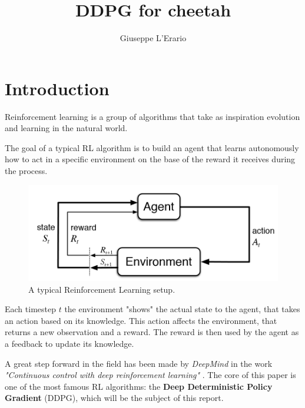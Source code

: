 \documentclass[10pt,a4paper]{scrartcl}
\author{Giuseppe L'Erario}
\date{}
\title{DDPG for cheetah}
\begin{document}


\tableofcontents

\clearpage
{}
\section{Introduction}

Reinforcement learning is a group of algorithms that take as inspiration evolution and learning in the natural world. 

The goal of a typical RL algorithm is to build an agent that learns autonomously how to act in a specific environment on the base of the reward it receives during the process.

\begin{figure}[h]
	\centering
	\includegraphics[width=0.7\linewidth]{images/rl}
	\caption{A typical Reinforcement Learning setup.}
	\label{fig:rl}
\end{figure}

Each timestep $ t $ the environment "shows" the actual state to the agent, that takes an action based on its knowledge. This action affects the environment, that returns a new observation and a reward. The reward is then used by the agent as a feedback to update its knowledge.

A great step forward in the field has been made by \textit{DeepMind} in the work \textit{"Continuous control with deep reinforcement learning"} \cite{lillicrap2015continuous}. The core of this paper is one of the most famous RL algorithms: the \textbf{Deep Deterministic Policy Gradient} (DDPG), which will be the subject of this report.

  
\end{document}
